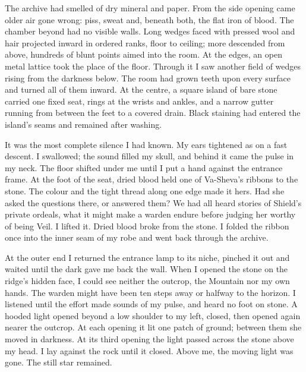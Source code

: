 The archive had smelled of dry mineral and paper. From the side opening came older air gone wrong: piss, sweat and, beneath both, the flat iron of blood. The chamber beyond had no visible walls. Long wedges faced with pressed wool and hair projected inward in ordered ranks, floor to ceiling; more descended from above, hundreds of blunt points aimed into the room. At the edges, an open metal lattice took the place of the floor. Through it I saw another field of wedges rising from the darkness below. The room had grown teeth upon every surface and turned all of them inward. At the centre, a square island of bare stone carried one fixed seat, rings at the wrists and ankles, and a narrow gutter running from between the feet to a covered drain. Black staining had entered the island's seams and remained after washing. \par

It was the most complete silence I had known. My ears tightened as on a fast descent. I swallowed; the sound filled my skull, and behind it came the pulse in my neck. The floor shifted under me until I put a hand against the entrance frame. At the foot of the seat, dried blood held one of Va-Sheva's ribbons to the stone. The colour and the tight thread along one edge made it hers. Had she asked the questions there, or answered them? We had all heard stories of Shield's private ordeals, what it might make a warden endure before judging her worthy of being Veil. I lifted it. Dried blood broke from the stone. I folded the ribbon once into the inner seam of my robe and went back through the archive.\par

\ornament

At the outer end I returned the entrance lamp to its niche, pinched it out and waited until the dark gave me back the wall. When I opened the stone on the ridge's hidden face, I could see neither the outcrop, the Mountain nor my own hands. The warden might have been ten steps away or halfway to the horizon. I listened until the effort made sounds of my pulse, and heard no foot on stone. A hooded light opened beyond a low shoulder to my left, closed, then opened again nearer the outcrop. At each opening it lit one patch of ground; between them she moved in darkness. At its third opening the light passed across the stone above my head. I lay against the rock until it closed. Above me, the moving light was gone. The still star remained.\par

